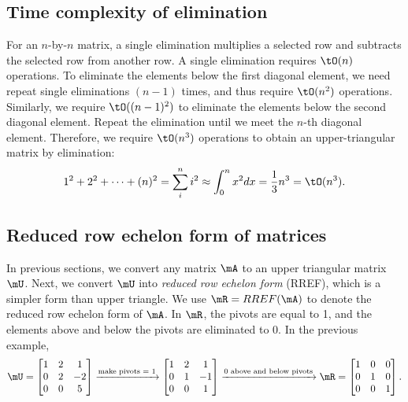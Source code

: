 \documentclass[11pt]{article}
\theoremstyle{plain}
\theoremstyle{definition}
\begin{document}
\subsection{Time complexity of elimination}
For an $n$-by-$n$ matrix, a single elimination multiplies a selected row and subtracts the selected row from another row. A single elimination requires $\tO(n)$ operations. To eliminate the elements below the first diagonal element, we need repeat single eliminations $(n-1)$ times,  and thus require $\tO(n^2)$ operations. Similarly, we require $\tO((n-1)^2)$  to eliminate the elements below the second diagonal element. Repeat the elimination until we meet the $n$-th diagonal element. Therefore, we require $\tO(n^3)$ operations to obtain an upper-triangular matrix by elimination:
 \[ 1^2 + 2^2 + \cdots +(n)^2 = \sum_{i}^{n} i^2 \approx \int_{0}^{n} x^2 dx = \frac{1}{3} n^3 = \tO(n^3).\]


\subsection{Reduced row echelon form of matrices}
In previous sections, we convert any matrix $\mA$ to an upper triangular matrix $\mU$. Next, we convert $\mU$ into \textit{reduced row echelon form} (RREF), which is a simpler form than upper triangle. We use $\mR = RREF(\mA)$ to denote the reduced row echelon form of $\mA$. In $\mR$, the pivots are equal to 1, and the elements above and below the pivots are eliminated to 0. In the previous example,
\begin{align}
	\mU = \begin{bmatrix}
		1 &2&1\\0 & 2 & -2\\ 0 & 0 & 5
	\end{bmatrix} \xrightarrow{\text{make pivots = 1}} \begin{bmatrix}
		1 &2&1\\0 & 1 & -1\\ 0 & 0 & 1
	\end{bmatrix} 
	\xrightarrow{\text{0 above and below pivots}} \mR =  \begin{bmatrix}
		1 &0&0\\0 & 1 & 0\\ 0 & 0 & 1
	\end{bmatrix} .
\end{align}
\end{document}
